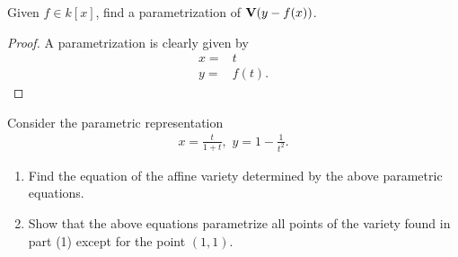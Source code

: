 \begin{exercise}{3}
Given $f\in k[x]$, find a parametrization of $\mathbf{V}(y - f(x))$.
\end{exercise}
\begin{proof}
    A parametrization is clearly given by
    \begin{align*}
        x =& t\\
        y =& f(t).
    \end{align*}
\end{proof}

\begin{exercise}{4}
Consider the parametric representation
\begin{align*}
    x=\frac{t}{1+t},\,\,y=1-\frac{1}{t^2}.
\end{align*}
\begin{enumerate}
    \item Find the equation of the affine variety determined by the above parametric equations.
    \item Show that the above equations parametrize all points of the variety found in part (1) except for the point $(1,1)$.
\end{enumerate}
\end{exercise}
